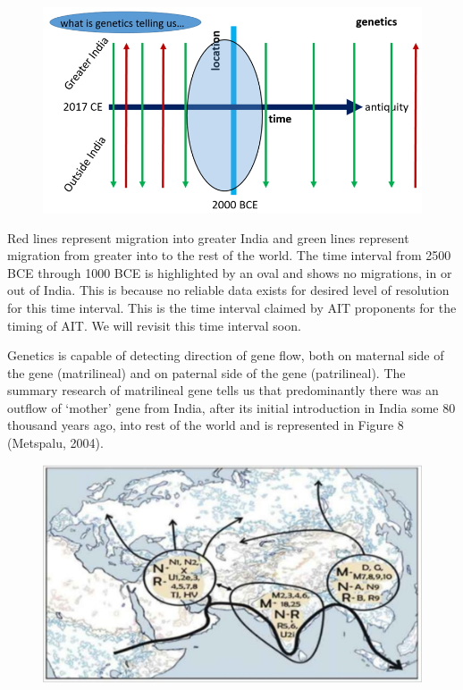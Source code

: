 \begin{figure}[!htbp]
\includegraphics[scale=0.25]{"images/8-07.jpg"}
\caption{}\label{art8-fig07}
\end{figure}

Red lines represent migration into greater India and green lines represent migration from greater into to the rest of the world. The time interval from 2500 BCE through 1000 BCE is highlighted by an oval and shows no migrations, in or out of India. This is because no reliable data exists for desired level of resolution for this time interval. This is the time interval claimed by AIT proponents for the timing of AIT. We will revisit this time interval soon.

Genetics is capable of detecting direction of gene flow, both on maternal side of the gene (matrilineal) and on paternal side of the gene (patrilineal). The summary research of matrilineal gene tells us that predominantly there was an outflow of ‘mother’ gene from India, after its initial introduction in India some 80 thousand years ago, into rest of the world and is represented in Figure 8 (Metspalu, 2004).

\begin{figure}[!htbp]
\includegraphics[scale=0.26]{"images/8-08.jpg"}
\caption{}\label{art8-fig08}
\end{figure}

